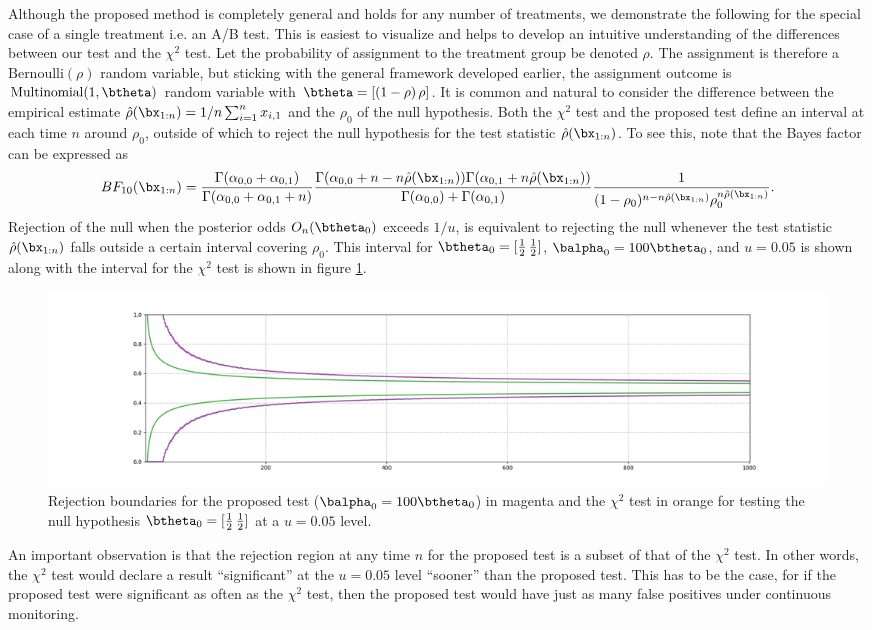 \documentclass[11pt]{article}
\begin{document}
  Although the proposed method is completely general and holds for any number of treatments, we demonstrate the following for the special case of a single treatment i.e. an A/B test.
  This is easiest to visualize and helps to develop an intuitive understanding of the differences between our test and the $\chi^2$ test.
  Let the probability of assignment to the treatment group be denoted $\rho$.
The assignment is therefore a $\text{Bernoulli}(\rho)$ random variable, but sticking with the general framework developed earlier, the assignment outcome is $\text{Multinomial}(1,\btheta)$ random variable with $\btheta = [(1-\rho)\, \rho]$.
It is common and natural to consider the difference between the empirical estimate $\hat{\rho}(\bx_{1:n}) = 1/n \sum_{i=1}^{n} x_{i,1}$ and the $\rho_0$ of the null hypothesis.
Both the $\chi^2$ test and the proposed test define an interval at each time $n$ around $\rho_0$, outside of which to reject the null hypothesis for the test statistic $\hat{\rho}(\bx_{1:n})$.
To see this, note that the Bayes factor can be expressed as
\begin{equation}
  \label{eq:bayes_factor}
 BF_{10}(\bx_{1:n})  = \frac{\Gamma(\alpha_{0,0}+\alpha_{0,1})}{\Gamma(\alpha_{0,0}+\alpha_{0,1}+n)}\frac{\Gamma(\alpha_{0,0} + n-n\hat{\rho}(\bx_{1:n} ))\Gamma(\alpha_{0,1} + n\hat{\rho}(\bx_{1:n} )) }{\Gamma(\alpha_{0,0} )+\Gamma(\alpha_{0,1} )}\frac{1}{(1-\rho_{0})^{n-n\hat{\rho}(\bx_{1:n})}\rho_{0}^{n\hat{\rho}(\bx_{1:n})}}.
\end{equation}
  Rejection of the null when the posterior odds $O_n(\btheta_0)$ exceeds $1/u$, is equivalent to rejecting the null whenever the test statistic $\hat{\rho}(\bx_{1:n})$ falls outside a certain interval covering $\rho_0$.
This interval for $\btheta_0 = [\frac{1}{2}\, \frac{1}{2}]$, $\balpha_0 = 100\btheta_0 $, and $u=0.05$ is shown along with the interval for the $\chi^2$ test is shown in figure \ref{fig:critical}.
\begin{figure}[H]
  \centering
  \includegraphics[scale=0.35]{images/critical_regions.png}
  \caption{Rejection boundaries for the proposed test ($\balpha_0 = 100\btheta_0$) in magenta and the $\chi^2$ test in orange for testing the null hypothesis $\btheta_0 = [\frac{1}{2} \, \frac{1}{2}]$ at a $u=0.05$ level.
}
    \label{fig:critical}
  \end{figure}
  An important observation is that the rejection region at any time $n$ for the proposed test is a subset of that of the $\chi^2$ test.
In other words, the $\chi^2$ test would declare a result ``significant'' at the $u=0.05$ level ``sooner'' than the proposed test.
This has to be the case, for if the proposed test were significant as often as the $\chi^2$ test, then the proposed test would have just as many false positives under continuous monitoring.
  
\end{document}
